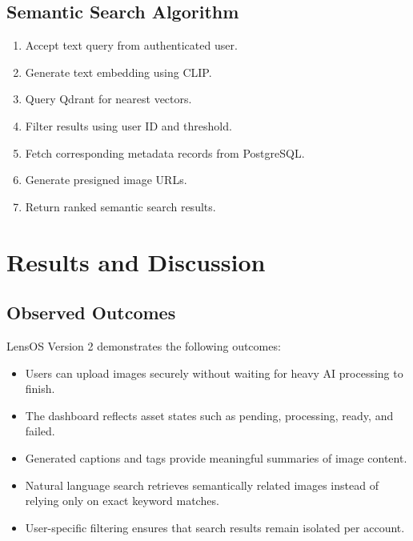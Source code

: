 \documentclass[12pt,a4paper]{report}
\begin{document}
\section{Semantic Search Algorithm}
\begin{enumerate}[leftmargin=*]
    \item Accept text query from authenticated user.
    \item Generate text embedding using CLIP.
    \item Query Qdrant for nearest vectors.
    \item Filter results using user ID and threshold.
    \item Fetch corresponding metadata records from PostgreSQL.
    \item Generate presigned image URLs.
    \item Return ranked semantic search results.
\end{enumerate}

\chapter{Results and Discussion}
\section{Observed Outcomes}
LensOS Version 2 demonstrates the following outcomes:
\begin{itemize}[leftmargin=*]
    \item Users can upload images securely without waiting for heavy AI processing to finish.
    \item The dashboard reflects asset states such as pending, processing, ready, and failed.
    \item Generated captions and tags provide meaningful summaries of image content.
    \item Natural language search retrieves semantically related images instead of relying only on exact keyword matches.
    \item User-specific filtering ensures that search results remain isolated per account.
\end{itemize}
\end{document}
